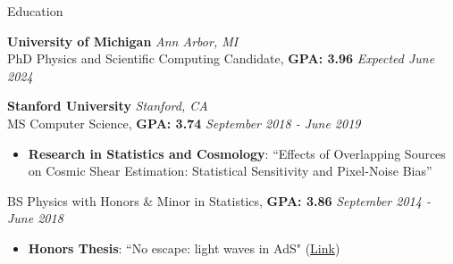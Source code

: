 \begin{rSection}{Education}

{\bf University of Michigan} \hfill {\em Ann Arbor, MI} 
\\ PhD Physics and Scientific Computing Candidate, \textbf{GPA: 3.96} \hfill {\em Expected June 2024}
\vspace*{-0.1cm}
%

{\bf Stanford University} \hfill {\em Stanford, CA} 
\\ MS Computer Science, \textbf{GPA: 3.74} \hfill {\em September 2018 - June 2019}

\vspace*{-0.1cm}
%
\begin{itemize}[itemsep=-0.3em] %

    \item 
    \textbf{Research in Statistics and Cosmology}: ``Effects of Overlapping Sources on Cosmic Shear Estimation:  Statistical Sensitivity and Pixel-Noise Bias''
\end{itemize}

%
BS Physics with Honors \& Minor in Statistics, \textbf{GPA: 3.86} \hfill {\em September 2014 - June 2018}
%
\vspace*{-0.1cm}
\begin{itemize}[itemsep=-0.25em] 

    \item 
    \textbf{Honors Thesis}: ``No escape: light waves in AdS" (\href{https://purl.stanford.edu/vf208qp2190}{Link})

\end{itemize}
%
\vspace*{-0.1cm}
\end{rSection}


